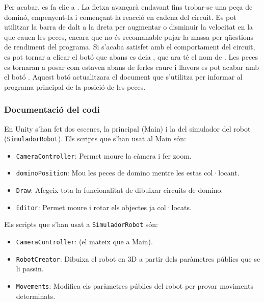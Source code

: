 Per acabar, es fa clic a . La fletxa avançarà endavant fins trobar-se una peça de dominó, empenyent-la i començant la reacció en cadena del circuit. Es pot utilitzar la barra de dalt a la dreta per augmentar o disminuir la velocitat en la que cauen les peces, encara que no és recomanable pujar-la massa per qüestions de rendiment del programa. Si s'acaba satisfet amb el comportament del circuit, es pot tornar a clicar el botó que abans es deia , que ara té el nom de . Les peces es tornaran a posar com estaven abans de ferles caure i llavors es pot acabar amb el botó . Aquest botó actualitzara el document que s'utilitza per informar al programa principal de la posició de les peces.


\subsubsection{Documentació del codi}
En Unity s'han fet dos escenes, la principal (Main) i la del simulador del robot (\verb|SimuladorRobot|). Els scripts que s'han usat al Main són: 
\begin{itemize}
\item \verb|CameraController|: Permet moure la càmera i fer zoom.


\item \verb|dominoPosition|: Mou les peces de domino mentre les estas col·locant.


\item \verb|Draw|: Afegeix tota la funcionalitat de dibuixar circuits de domino.


\item \verb|Editor|: Permet moure i rotar els objectes ja col·locats.

\end{itemize}
Els scripts que s'han usat a \verb|SimuladorRobot| són:
\begin{itemize}
\item \verb|CameraController|: (el mateix que a Main).
\item \verb|RobotCreator|: Dibuixa el robot en 3D a partir dels paràmetres públics que se li passin.

\item \verb|Movements|: Modifica els paràmetres públics del robot per provar moviments determinats.

\end{itemize}




